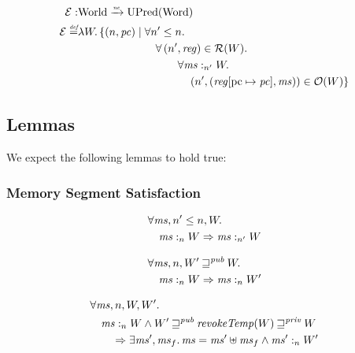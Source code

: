 \documentclass[a4paper]{article}
\newcommand{\update}[2]{[#1 \mapsto #2]}
\newcommand{\nefun}{\xrightarrow{\textit{\tiny{ne}}}}
\newcommand{\defeq}{\stackrel{\textit{\tiny{def}}}{=}}
\newcommand{\var}[1]{\mathit{#1}}
\newcommand{\hs}{\var{ms}}
\newcommand{\pc}{\mathit{pc}}
\newcommand{\pcreg}{\mathrm{pc}}
\newcommand{\reg}{\var{reg}}
\newcommand{\heap}{\var{mem}}
\newcommand{\futurewk}{\mathbin{\sqsupseteq}^{\var{pub}}}
\newcommand{\futurestr}{\mathbin{\sqsupseteq}^{\var{priv}}}
\newcommand{\heapSat}[3][\heap]{#1 :_{#2} #3}
\newcommand{\asmType}{\plaindom{AsmType}}
\newcommand{\plaindom}[1]{\mathrm{#1}}
\newcommand{\Words}{\plaindom{Word}}
\newcommand{\Worlds}{\plaindom{World}}
\newcommand{\UPred}[1]{\plaindom{UPred}(#1)}
\newcommand{\intr}[2]{\mathcal{#1}}
\newcommand{\exprintr}[1]{\intr{E}{#1}}
\newcommand{\regintr}[1]{\intr{R}{#1}}
\newcommand{\stder}{\exprintr{\asmType}}
\newcommand{\stdrr}{\regintr{\asmType}}
\newcommand{\observations}{\mathcal{O}}
\newcommand{\npair}[2][n]{\left(#1,#2 \right)}
\begin{document}
\begin{align*}
  \stder : & \Worlds \nefun \UPred{\Words} \\
  \stder \defeq & \lambda W \ldotp \{ \npair{\pc} \mid 
  \begin{aligned}[t]
    & \forall n' \leq n \ldotp\\
    & \quad \forall \npair[n']{\reg} \in \stdrr(W) \ldotp \\
    & \quad \qquad  \forall \heapSat[\hs]{n'}{W} \ldotp \\
    & \quad \qquad \quad \npair[n']{(\reg\update{\pcreg}{\pc},\hs)} \in \observations(W) \}
  \end{aligned}
\end{align*}

\subsection{Lemmas}
We expect the following lemmas to hold true:
\subsubsection{Memory Segment Satisfaction}
\begin{lemma}
  \begin{align*}
    &\forall \hs, n' \leq n, W \ldotp \\
    &\quad \heapSat[\hs]{n}{W} \Rightarrow \heapSat[\hs]{n'}{W}
  \end{align*}
\end{lemma}

\begin{lemma}
  \begin{align*}
    & \forall \hs, n, W' \futurewk W \ldotp \\
    & \quad \heapSat[\hs]{n}{W} \Rightarrow \heapSat[\hs]{n}{W'}
  \end{align*}
\end{lemma}

\begin{lemma}
  \begin{align*}
    & \forall \hs, n, W, W' \ldotp \\
    & \quad  \heapSat[\hs]{n}{W} \land W' \futurewk \wrev{W} \futurestr W \\
    & \qquad \Rightarrow \exists \hs', \hs_f \ldotp \hs = \hs' \uplus \hs_f \land \heapSat[\hs']{n}{W'}
  \end{align*}
\end{lemma}
\end{document}
